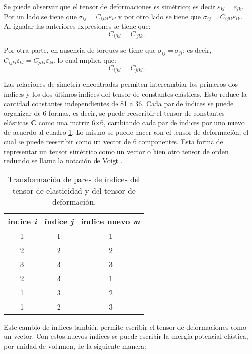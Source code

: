 \documentclass[12pt]{article}
\begin{document}
Se puede observar que el tensor de deformaciones es simétrico; es decir $\varepsilon_{kl} = \varepsilon_{lk}$. Por un lado se tiene que $\sigma_{ij} = C_{ijkl}\varepsilon_{kl}$ y por otro lado se tiene que $\sigma_{ij} = C_{ijlk}\varepsilon_{lk}$. Al igualar las anteriores expresiones se tiene que:
\begin{equation}
	C_{ijkl} = C_{ijlk}.
\end{equation}

Por otra parte, en ausencia de torques se tiene que $\sigma_{ij} = \sigma_{ji}$; es decir, $C_{ijkl}\varepsilon_{kl} = C_{jikl}\varepsilon_{kl}$, lo cual implica que: 
\begin{equation}
	C_{ijkl} = C_{jikl}.
\end{equation}


Las relaciones de simetría encontradas permiten intercambiar los primeros dos índices y los dos últimos indices del tensor de constantes elásticas. Esto reduce la cantidad constantes independientes de 81 a 36. Cada par de índices se puede organizar de 6 formas, es decir, se puede reescribir el tensor de constantes elásticas $\bm{C}$ como una matriz 6$\times$6, cambiando cada par de índices por uno nuevo de acuerdo al cuadro \ref{tab:my-table}. Lo mismo se puede hacer con el tensor de deformación, el cual se puede reescribir como un vector de 6 componentes. Esta forma de representar un tensor simétrico como un vector o bien otro tensor de orden reducido se llama la notación de Voigt \cite{JAMAL2014592}.


\begin{table}[H]
	\centering
	\begin{tabular}{|c|c|c|}
	\hline
	índice \textit{i} & índice \textit{j} & índice nuevo \textit{m} \\
	\hline
	1 & 1 & 1            \\
	2 & 2 & 2            \\
	3 & 3 & 3            \\
	2 & 3 & 1            \\
	1 & 3 & 2            \\
	1 & 2 & 3    		 \\	
	\hline       
	\end{tabular}
	\caption{Transformación de pares de índices del tensor de elasticidad y del tensor de deformación.}
	\label{tab:my-table}
\end{table}

Este cambio de índices también permite escribir el tensor de deformaciones como un vector. Con estos nuevos índices se puede escribir la energía potencial elástica, por unidad de volumen, de la siguiente manera: 
\end{document}

